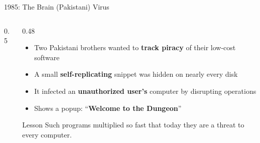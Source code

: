 \documentclass[aspectratio=169,11pt,xcolor={table}]{beamer}
\begin{document}
\begin{frame}{1985: The Brain (Pakistani) Virus}
  \begin{columns}[c]
    \begin{column}{0.5\textwidth}
      \centering
    \end{column}
    \begin{column}{0.48\textwidth}
      \begin{itemize}\small\setlength{\itemsep}{4pt}
        \item Two Pakistani brothers wanted to \textbf{track piracy} of their low-cost software
        \item A small \textbf{self-replicating} snippet was hidden on nearly every disk
        \item It infected an \textbf{unauthorized user's} computer by disrupting operations
        \item Shows a popup: ``\textbf{Welcome to the Dungeon}''
      \end{itemize}
      \vspace{1mm}
      \begin{alertblock}{Lesson}
        \small Such programs multiplied so fast that today they are a threat to every computer.
      \end{alertblock}
    \end{column}
  \end{columns}
\end{frame}
\end{document}
